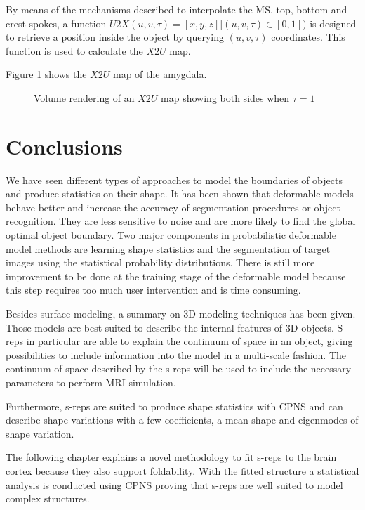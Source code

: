 By means of the mechanisms described to interpolate the MS, top, bottom and crest spokes, 
a function $U2X(u, v, \tau) = [x, y, z] | (u, v, \tau) \in [0, 1])$ is designed to retrieve a position inside the 
object by querying $(u, v, \tau)$ coordinates.
This function is used to calculate the $X2U$ map. 

Figure \ref{fig:x2uMap} shows the $X2U$ map of the amygdala.

\begin{figure} 
 \centering  
 \caption[X2U's map volume rendering.]{Volume rendering of an $X2U$ map showing both sides when $\tau = 1$}
 \label{fig:x2uMap}  
\end{figure} 


\section{Conclusions}
\label{sec:3dRepConclusion}

We have seen different types of approaches to model the boundaries of objects and produce statistics on 
their shape.
It has been shown that deformable models behave better 
and increase the accuracy of segmentation procedures or object recognition. They 
are less sensitive to noise and are more likely to find the global optimal object boundary.
Two major components in probabilistic deformable model methods are  
learning shape statistics and the segmentation of target images using the statistical probability distributions. 
There is still more improvement to be done 
at the training stage of the deformable model because this step requires 
too much user intervention and is time consuming. 

Besides surface modeling, a summary on 3D modeling techniques has been given. 
Those models are best suited to describe the internal features of 3D objects.
S-reps in particular are able to explain the continuum of space in an object, 
giving possibilities to include information into the model in a multi-scale fashion. 
The continuum of space described by the s-reps will be used  
to include the necessary parameters to perform MRI simulation. 

Furthermore, s-reps are suited to produce shape statistics with CPNS and can describe
shape variations with a few coefficients, a mean shape and eigenmodes of shape variation. 

The following chapter explains a novel methodology to 
fit s-reps to the brain cortex because they also support
foldability.
With the fitted structure a statistical analysis is conducted using CPNS
proving that s-reps are well suited to model 
complex structures. 

\newpage

